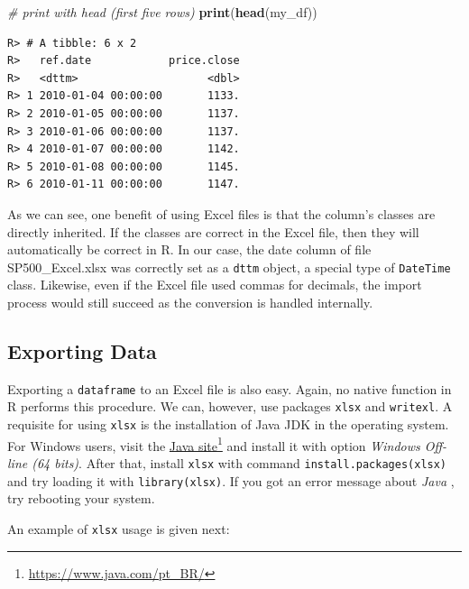 \documentclass[
  12pt,
]{book}
\newenvironment{Shaded}{\begin{snugshade}}{\end{snugshade}}
\newcommand{\CommentTok}[1]{\textcolor[rgb]{0.37,0.37,0.37}{\textit{#1}}}
\newcommand{\KeywordTok}[1]{\textcolor[rgb]{0.27,0.27,0.27}{\textbf{#1}}}
\newcommand{\NormalTok}[1]{#1}
\begin{document}
\begin{Shaded}
\begin{Highlighting}[]
\CommentTok{# print with head (first five rows)}
\KeywordTok{print}\NormalTok{(}\KeywordTok{head}\NormalTok{(my_df))}
\end{Highlighting}
\end{Shaded}

\begin{verbatim}
R> # A tibble: 6 x 2
R>   ref.date            price.close
R>   <dttm>                    <dbl>
R> 1 2010-01-04 00:00:00       1133.
R> 2 2010-01-05 00:00:00       1137.
R> 3 2010-01-06 00:00:00       1137.
R> 4 2010-01-07 00:00:00       1142.
R> 5 2010-01-08 00:00:00       1145.
R> 6 2010-01-11 00:00:00       1147.
\end{verbatim}

As we can see, one benefit of using Excel files is that the column's classes are directly inherited. If the classes are correct in the Excel file, then they will automatically be correct in R. In our case, the date column of file SP500\_Excel.xlsx was correctly set as a \texttt{dttm} object, a special type of \texttt{DateTime} class. Likewise, even if the Excel file used commas for decimals, the import process would still succeed as the conversion is handled internally.

\hypertarget{exporting-data-1}{%
\subsection{Exporting Data}\label{exporting-data-1}}

Exporting a \texttt{dataframe} to an Excel file is also easy. Again, no native function in R performs this procedure. We can, however, use packages \texttt{xlsx} and \texttt{writexl}. A requisite for using \texttt{xlsx} is the installation of Java JDK in the operating system. For Windows users, visit the \href{https://www.java.com/pt_BR/}{Java site}\footnote{\url{https://www.java.com/pt_BR/}} and install it with option \emph{Windows Off-line (64 bits)}. After that, install \texttt{xlsx} with command \texttt{install.packages(\textquotesingle{}xlsx\textquotesingle{})} and try loading it with \texttt{library(xlsx)}. If you got an error message about \emph{Java} , try rebooting your system.

An example of \texttt{xlsx} usage is given next: 
\end{document}
